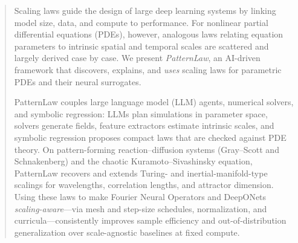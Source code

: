 \documentclass{article}
\theoremstyle{plain}
\theoremstyle{definition}
\theoremstyle{remark}
\begin{document}
\printAffiliationsAndNotice{\icmlEqualContribution} %

\vskip 0.3in

\begin{abstract}
Scaling laws guide the design of large deep learning systems by linking model size, data, and compute to performance. For nonlinear partial differential equations (PDEs), however, analogous laws relating equation parameters to intrinsic spatial and temporal scales are scattered and largely derived case by case. We present \emph{PatternLaw}, an AI-driven framework that discovers, explains, and \emph{uses} scaling laws for parametric PDEs and their neural surrogates.

PatternLaw couples large language model (LLM) agents, numerical solvers, and symbolic regression: LLMs plan simulations in parameter space, solvers generate fields, feature extractors estimate intrinsic scales, and symbolic regression proposes compact laws that are checked against PDE theory. On pattern-forming reaction--diffusion systems (Gray--Scott and Schnakenberg) and the chaotic Kuramoto--Sivashinsky equation, PatternLaw recovers and extends Turing- and inertial-manifold-type scalings for wavelengths, correlation lengths, and attractor dimension. Using these laws to make Fourier Neural Operators and DeepONets \emph{scaling-aware}---via mesh and step-size schedules, normalization, and curricula—consistently improves sample efficiency and out-of-distribution generalization over scale-agnostic baselines at fixed compute.
\end{abstract}

\end{document}

